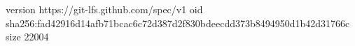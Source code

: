 version https://git-lfs.github.com/spec/v1
oid sha256:fad42916d14afb71bcac6c72d387d2f830bdeecdd373b8494950d1b42d31766c
size 22004
